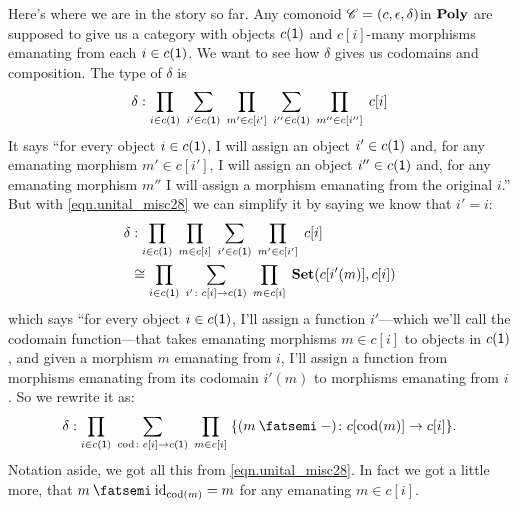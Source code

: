 \documentclass[DynamicalBook]{subfiles}
\begin{document}
Here's where we are in the story so far. Any comonoid $\mathscr{C}=(c,\epsilon,\delta)$in $\textbf{Poly}$ are supposed to give us a category with objects $c(\textsf{1})$ and $c[i]$-many morphisms emanating from each $i\in c(\textsf{1})$. We want to see how $\delta$ gives us codomains and composition. The type of $\delta$ is
\[
\delta:\prod_{i\in c(\textsf{1})}\;\sum_{i'\in c(\textsf{1})}\;\prod_{m'\in c[i']}\;\sum_{i''\in c(\textsf{1})}\;\prod_{m''\in c[i'']}\;c[i]
\]
It says ``for every object $i\in c(\textsf{1})$, I will assign an object $i'\in c(\textsf{1})$ and, for any emanating morphism $m'\in c[i']$, I will assign an object $i''\in c(\textsf{1})$ and, for any emanating morphism $m''$ I will assign a morphism emanating from the original $i$.'' But with \eqref{eqn.unital_misc28} we can simplify it by saying we know that $i'=i$:
\begin{align*}
  \delta&:
  \prod_{i\in c(\textsf{1})}\;\prod_{m\in c[i]}\;\sum_{i'\in c(\textsf{1})}\;\prod_{m'\in c[i']}\;c[i]\\&\cong
	\prod_{i\in c(\textsf{1})}\;\sum_{i'\colon c[i]\to c(\textsf{1})}\;\prod_{m\in c[i]}\;\textbf{Set}(c[i'(m)],c[i])
\end{align*}
which says ``for every object $i\in c(\textsf{1})$, I'll assign a function $i'$---which we'll call the codomain function---that takes emanating morphisms $m\in c[i]$ to objects in $c(\textsf{1})$, and given a morphism $m$ emanating from $i$, I'll assign a function from morphisms emanating from its codomain $i'(m)$ to morphisms emanating from $i$. So we rewrite it as:
\[
\delta:	\prod_{i\in c(\1)}\;\sum_{\cod\colon c[i]\to c(\1)}\;\prod_{m\in c[i]}\;\{(m\then -)\colon c[\cod(m)]\to c[i]\}.
\]
Notation aside, we got all this from \eqref{eqn.unital_misc28}. In fact we got a little more, that $m\then\id_{\cod(m)}=m$ for any emanating $m\in c[i]$.
\end{document}
